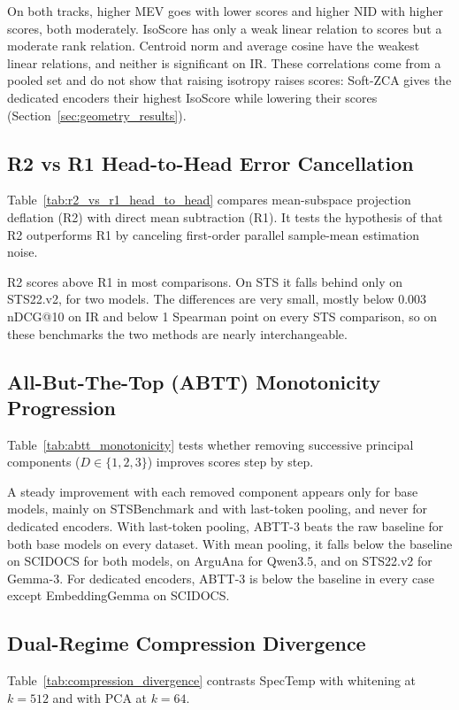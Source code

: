 On both tracks, higher MEV goes with lower scores and higher NID with higher scores, both moderately. IsoScore has only a weak linear relation to scores but a moderate rank relation. Centroid norm and average cosine have the weakest linear relations, and neither is significant on IR. These correlations come from a pooled set and do not show that raising isotropy raises scores: Soft-ZCA gives the dedicated encoders their highest IsoScore while lowering their scores (Section~\ref{sec:geometry_results}).

\subsection{R2 vs R1 Head-to-Head Error Cancellation}
Table~\ref{tab:r2_vs_r1_head_to_head} compares mean-subspace projection deflation (R2) with direct mean subtraction (R1). It tests the hypothesis of \citet{ren2025correcting} that R2 outperforms R1 by canceling first-order parallel sample-mean estimation noise.

R2 scores above R1 in most comparisons. On STS it falls behind only on STS22.v2, for two models. The differences are very small, mostly below 0.003 nDCG@10 on IR and below 1 Spearman point on every STS comparison, so on these benchmarks the two methods are nearly interchangeable.

\subsection{All-But-The-Top (ABTT) Monotonicity Progression}
Table~\ref{tab:abtt_monotonicity} tests whether removing successive principal components ($D \in \{1, 2, 3\}$) improves scores step by step.

A steady improvement with each removed component appears only for base models, mainly on STSBenchmark and with last-token pooling, and never for dedicated encoders. With last-token pooling, ABTT-3 beats the raw baseline for both base models on every dataset. With mean pooling, it falls below the baseline on SCIDOCS for both models, on ArguAna for Qwen3.5, and on STS22.v2 for Gemma-3. For dedicated encoders, ABTT-3 is below the baseline in every case except EmbeddingGemma on SCIDOCS.

\subsection{Dual-Regime Compression Divergence}
Table~\ref{tab:compression_divergence} contrasts SpecTemp with whitening at $k=512$ and with PCA at $k=64$.

